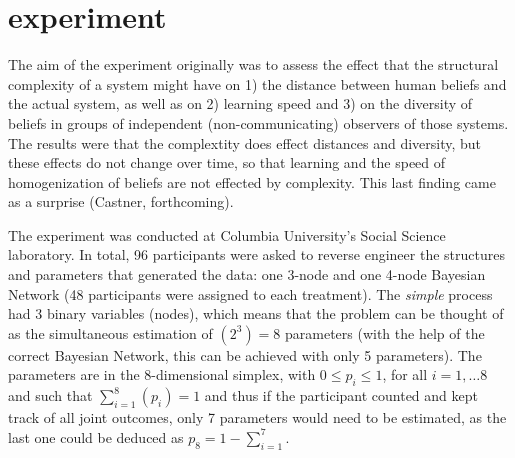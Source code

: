 \section{experiment}

The aim of the experiment originally was to assess the effect that the structural complexity of a system might have on 1) the distance between human beliefs and the actual system, as well as on 2) learning speed and 3) on the diversity of beliefs in groups of independent (non-communicating) observers of those systems. The results were that the complextity does effect distances and diversity, but these effects do not change over time, so that learning and the speed of homogenization of beliefs are not effected by complexity.  This last finding came as a surprise (Castner, forthcoming).  

The experiment was conducted at Columbia University's Social Science laboratory.  In total, 96 participants were asked to reverse engineer the structures and parameters that generated the data: one 3-node and one 4-node Bayesian Network (48 participants were assigned to each treatment). The {\it simple} process had 3 binary variables (nodes), which means that the problem can be thought of as the simultaneous estimation of $(2^3) = 8$ parameters (with the help of the correct Bayesian Network, this can be achieved with only 5 parameters). The parameters are in the 8-dimensional simplex, with $0\leq p_i \leq 1$, for all $i=1, \ldots 8$ and such that $\sum_{i=1}^8(p_i) =1$ and thus if the participant counted and kept track of all joint outcomes, only 7 parameters would need to be estimated, as the last one could be deduced as $p_8 =1-\sum_{i=1}^7$.  

